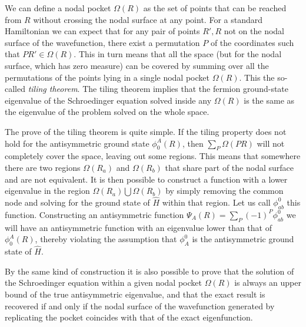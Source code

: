 We can define a nodal pocket $\Omega(R)$ as the set of points that can be reached from $R$ without crossing the nodal surface at any point. For a standard Hamiltonian we can expect that for any pair of points $R',R$ not on the nodal surface of the wavefunction, there exist a permutation $P$ of the coordinates such that $PR'\in \Omega(R)$. This in turn means that all the space (but for the nodal surface, which has zero measure) can be covered by summing over all the permutations of the points lying in a single nodal pocket $\Omega(R)$. This the so-called {\it tiling theorem}. The tiling theorem implies that the fermion ground-state eigenvalue of the Schroedinger equation solved inside any $\Omega(R)$ is the same as the eigenvalue of the problem solved on the whole space. 

The prove of the tiling theorem is quite simple. If the tiling property does not hold for the antisymmetric ground state $\phi^A_0(R)$, then $\sum_P\Omega(PR)$ will not completely cover the space, leaving out some regions. This means that somewhere there are two regions $\Omega(R_a)$ and $\Omega(R_b)$ that share part of the nodal surface and are not equivalent. It is then possible to construct a function with a lower eigenvalue in the region $\Omega(R_a)\bigcup\Omega(R_b)$ by simply removing the common node and solving for the ground state of $\hat{H}$ within that region. Let us call $\phi^0_{ab}$ this function. Constructing an antisymmetric function $\Psi_A(R)=\sum_P(-1)^P\phi^0_{ab}$ we will have an antisymmetric function with an eigenvalue lower than that of $\phi^A_0(R)$, thereby violating the assumption that $\phi_A^0$ is the antisymmetric ground state of $\hat{H}$.

By the same kind of construction it is also possible to prove that the solution of the Schroedinger equation within a given nodal pocket $\Omega(R)$ is always an upper bound of the true antisymmetric eigenvalue, and that the exact result is recovered if and only if the nodal surface of the wavefunction generated by replicating the pocket coincides with that of the exact eigenfunction.

